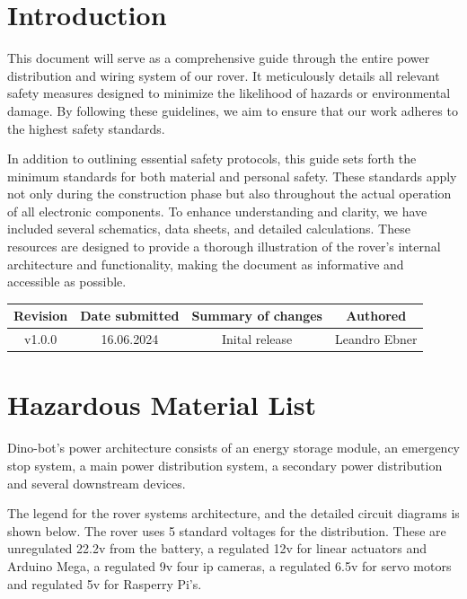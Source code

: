 \section{Introduction}

This document will serve as a comprehensive guide through the entire power distribution and wiring system of our rover. It meticulously details all relevant safety measures designed to minimize the likelihood of hazards or environmental damage. By following these guidelines, we aim to ensure that our work adheres to the highest safety standards. 

\vspace{5mm}

In addition to outlining essential safety protocols, this guide sets forth the minimum standards for both material and personal safety. These standards apply not only during the construction phase but also throughout the actual operation of all electronic components. To enhance understanding and clarity, we have included several schematics, data sheets, and detailed calculations. These resources are designed to provide a thorough illustration of the rover's internal architecture and functionality, making the document as informative and accessible as possible.

\begin{table}[b]
    \centering
    \begin{tabular}{|c|c|c|c|} \hline 
         Revision&  Date submitted& Summary of changes  &Authored\\ \hline 
         v1.0.0&  16.06.2024& Inital release  &Leandro Ebner\\ \hline
    \end{tabular}
\end{table}
\clearpage


\section{Hazardous Material List}



Dino-bot's power architecture consists of an energy storage module, an emergency stop system, a main
power distribution system, a secondary power distribution and several
downstream devices.


The legend for the rover systems architecture, and the detailed circuit diagrams is
shown below.
The rover uses 5 standard voltages for the distribution. These are unregulated 22.2v
from the battery, a regulated 12v for linear actuators and Arduino Mega, a regulated 9v
four ip cameras, a regulated 6.5v for servo motors and regulated 5v for Rasperry Pi’s.


